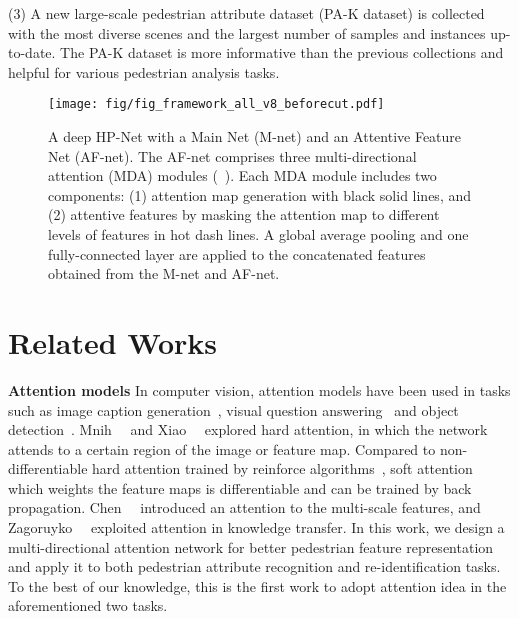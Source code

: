 \documentclass[10pt,twocolumn,letterpaper]{article}
\begin{document}
(3) A new large-scale pedestrian attribute dataset (PA-K dataset) is collected with the most diverse scenes and the largest number of samples and instances up-to-date.
The PA-K dataset is more informative than the previous collections and helpful for various pedestrian analysis tasks.







\begin{figure}[t]
\centering
\texttt{[image: fig/fig\_framework\_all\_v8\_beforecut.pdf]}
\caption{A deep HP-Net with a Main Net (M-net) and an Attentive Feature Net (AF-net). The AF-net comprises three multi-directional attention (MDA) modules (\ie~). Each MDA module includes two components: (1) attention map generation with black solid lines, and (2) attentive features by masking the attention map to different levels of features in hot dash lines. A global average pooling and one fully-connected layer are applied to the concatenated features obtained from the M-net and AF-net.
}
\label{fig:framework}
\end{figure}




\section{Related Works}
\label{sec:related_work}


\noindent \textbf{Attention models}
In computer vision, attention models have been used in tasks such as image caption generation~\cite{xu2015show}, visual question answering~\cite{lu2016hierarchical,xu2016ask} and object detection~\cite{ba2014multiple}.
Mnih~\etal~\cite{mnih2014recurrent} and Xiao~\etal~\cite{xiao2015application} explored hard attention, in which the network attends to a certain region of the image or feature map.
Compared to non-differentiable hard attention trained by reinforce algorithms~\cite{williams1992simple}, soft attention which weights the feature maps is differentiable and can be trained by back propagation.
Chen~\etal~\cite{chen2016attention} introduced an attention to the multi-scale features, and Zagoruyko~\etal~\cite{zagoruyko2016paying} exploited attention in knowledge transfer. In this work, we design a multi-directional attention network for better pedestrian feature representation and apply it to both pedestrian attribute recognition and re-identification tasks. To the best of our knowledge, this is the first work to adopt attention idea in the aforementioned two tasks.
\end{document}
